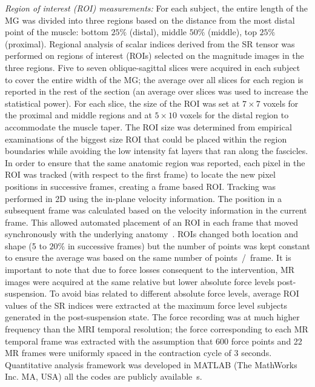 \textit{Region of interest (ROI) measurements:}
For each subject, the entire length of the MG was divided into three regions based on the distance from the most distal point of the muscle: bottom $25\%$ (distal), middle $50\%$ (middle), top $25\%$ (proximal).
Regional analysis of scalar indices derived from the SR tensor was performed on regions of interest (ROIs) selected on the magnitude images in the three regions.
Five to seven oblique-sagittal slices were acquired in each subject to cover the entire width of the MG; the average over all slices for each region is reported in the rest of the section (an average over slices was used to increase the statistical power). 
For each slice, the size of the ROI was set at $7 \times 7$ voxels for the proximal and middle regions and at $5 \times 10$ voxels for the distal region to accommodate the muscle taper.
The ROI size was determined from empirical examinations of the biggest size ROI that could be placed within the region boundaries while avoiding the low intensity fat layers that ran along the fascicles.
In order to ensure that the same anatomic region was reported, each pixel in the ROI was tracked (with respect to the first frame) to locate the new pixel positions in successive frames, creating a frame based ROI. 
Tracking was performed in 2D using the in-plane velocity information. 
The position in a subsequent frame was calculated based on the velocity information in the current frame. 
This allowed automated placement of an ROI in each frame that moved synchronously with the underlying anatomy~\cite{RNS16}.
ROIs changed both location and shape (5 to $20\%$ in successive frames) but the number of points was kept constant to ensure the average was based on the same number of points~/~frame. 
It is important to note that due to force losses consequent to the intervention, MR images were acquired at the same relative but lower absolute force levels post-suspension. 
To avoid bias related to different absolute force levels, average ROI values of the SR indices were extracted at the maximum force level subjects generated in the post-suspension state. 
The force recording was at much higher frequency than the MRI temporal resolution; the force corresponding to each MR temporal frame was extracted with the assumption that 600 force points and 22 MR frames were uniformly spaced in the contraction cycle of 3 seconds. Quantitative analysis framework was developed in MATLAB (The MathWorks Inc. MA, USA) all the codes are publicly available~\cite{2DSR}s.

